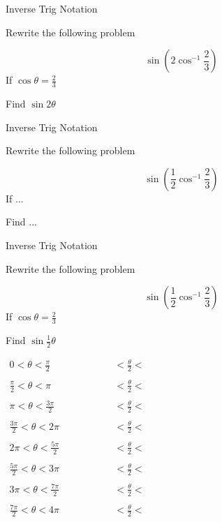 \documentclass{Ximera}
\begin{document}
\begin{frame}{Inverse Trig Notation}

Rewrite the following problem

\[ \sin \left (2 \cos^{-1}  \frac{2}{3} \right)\]
\vfill 
If $\cos \theta = \frac{2}{3}$

\bigskip

Find $\sin 2 \theta$
\vfill 

\end{frame}	
	\begin{frame}{Inverse Trig Notation}

Rewrite the following problem

\[ \sin \left (\frac{1}{2} \cos^{-1}  \frac{2}{3} \right)\]
\vfill 
If ...

\bigskip

Find ...
\vfill 

\end{frame}

\begin{frame}{Inverse Trig Notation}

Rewrite the following problem

\[ \sin \left (\frac{1}{2} \cos^{-1}  \frac{2}{3} \right)\]
\vfill 
If $\cos \theta = \frac{2}{3}$

\bigskip

Find $\sin \frac{1}{2} \theta$
\vfill 

\end{frame}	

\begin{frame}

$
\begin{array}{ccc}
0 < \theta < \frac{\pi}{2}&\qquad& \qquad < \frac{\theta}{2} < \; \\
&& \\
\frac{\pi}{2}  < \theta < \pi &\qquad& \qquad < \frac{\theta}{2} < \; \\
&& \\
\pi < \theta < \frac{3\pi}{2}&\qquad& \qquad < \frac{\theta}{2} < \; \\
&& \\
\frac{3\pi}{2}  < \theta < 2\pi &\qquad& \qquad < \frac{\theta}{2} < \; \\
&& \\
2\pi < \theta < \frac{5\pi}{2}&\qquad& \qquad < \frac{\theta}{2} < \; \\
&& \\
\frac{5\pi}{2}  < \theta < 3\pi &\qquad& \qquad < \frac{\theta}{2} < \; \\
&& \\
3\pi < \theta < \frac{7\pi}{2}&\qquad& \qquad < \frac{\theta}{2} < \; \\
&& \\
\frac{7\pi}{2}  < \theta < 4\pi &\qquad& \qquad < \frac{\theta}{2} < \; \\
&& \\
\end{array}
$
\end{frame}
	
\end{document}
